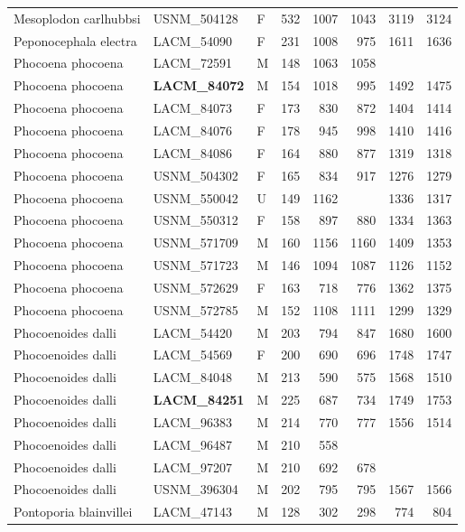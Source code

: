 \begin{table}[ht]
\begin{tabular}{lllrrrrr}
  Mesoplodon carlhubbsi & USNM\_504128 & F & 532 & 1007 & 1043 & 3119 & 3124 \\ 
  Peponocephala electra & LACM\_54090 & F & 231 & 1008 & 975 & 1611 & 1636 \\ 
  Phocoena phocoena & LACM\_72591 & M & 148 & 1063 & 1058 &  &  \\ 
  Phocoena phocoena & \textbf{ LACM\_84072 } & M & 154 & 1018 & 995 & 1492 & 1475 \\ 
  Phocoena phocoena & LACM\_84073 & F & 173 & 830 & 872 & 1404 & 1414 \\ 
  Phocoena phocoena & LACM\_84076 & F & 178 & 945 & 998 & 1410 & 1416 \\ 
  Phocoena phocoena & LACM\_84086 & F & 164 & 880 & 877 & 1319 & 1318 \\ 
  Phocoena phocoena & USNM\_504302 & F & 165 & 834 & 917 & 1276 & 1279 \\ 
  Phocoena phocoena & USNM\_550042 & U & 149 & 1162 &  & 1336 & 1317 \\ 
  Phocoena phocoena & USNM\_550312 & F & 158 & 897 & 880 & 1334 & 1363 \\ 
  Phocoena phocoena & USNM\_571709 & M & 160 & 1156 & 1160 & 1409 & 1353 \\ 
  Phocoena phocoena & USNM\_571723 & M & 146 & 1094 & 1087 & 1126 & 1152 \\ 
  Phocoena phocoena & USNM\_572629 & F & 163 & 718 & 776 & 1362 & 1375 \\ 
  Phocoena phocoena & USNM\_572785 & M & 152 & 1108 & 1111 & 1299 & 1329 \\ 
  Phocoenoides dalli & LACM\_54420 & M & 203 & 794 & 847 & 1680 & 1600 \\ 
  Phocoenoides dalli & LACM\_54569 & F & 200 & 690 & 696 & 1748 & 1747 \\ 
  Phocoenoides dalli & LACM\_84048 & M & 213 & 590 & 575 & 1568 & 1510 \\ 
  Phocoenoides dalli & \textbf{ LACM\_84251 } & M & 225 & 687 & 734 & 1749 & 1753 \\ 
  Phocoenoides dalli & LACM\_96383 & M & 214 & 770 & 777 & 1556 & 1514 \\ 
  Phocoenoides dalli & LACM\_96487 & M & 210 & 558 &  &  &  \\ 
  Phocoenoides dalli & LACM\_97207 & M & 210 & 692 & 678 &  &  \\ 
  Phocoenoides dalli & USNM\_396304 & M & 202 & 795 & 795 & 1567 & 1566 \\ 
  Pontoporia blainvillei & LACM\_47143 & M & 128 & 302 & 298 & 774 & 804 \\ 

\end{tabular}
\end{table}
